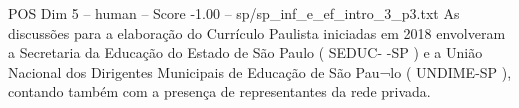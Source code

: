 \begin{textsample}{POS Dim 5 – human – Score -1.00 – sp/sp\_inf\_e\_ef\_intro\_3\_p3.txt}  \label{ex:f5_pos_017}
As discussões para a elaboração do Currículo Paulista iniciadas em 2018 envolveram a Secretaria da Educação do Estado de São Paulo ( SEDUC- -SP ) e a União Nacional dos Dirigentes Municipais de Educação de São Pau¬lo ( UNDIME-SP ), contando também com a presença de representantes da rede privada.

\end{textsample}
